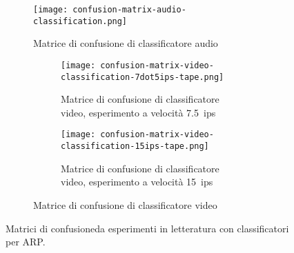 \begin{figure}[h]
    \begin{minipage}{\textwidth}
        \centering
        \begin{subfigure}{0.8\textwidth}
            \centering
            \texttt{[image: confusion-matrix-audio-classification.png]}
            \caption{Matrice di confusione di classificatore audio \cite[min. 35:10]{mpaistandardsMPAIPresentsContextbased2023}}
            \label{fig:confusion-matrix-audio-classification}
        \end{subfigure}
        \par\bigskip
        \begin{subfigure}{0.9\textwidth}
            \centering
            \begin{subfigure}{0.45\textwidth}
                \centering
                \texttt{[image: confusion-matrix-video-classification-7dot5ips-tape.png]}
                \caption{Matrice di confusione di classificatore video, esperimento a velocità \qty{7,5}{ips}}
                \label{fig:confusion-matrix-video-classification-7dot5ips-tape}
            \end{subfigure}
            \hfill
            \begin{subfigure}{0.45\textwidth}
                \centering
                \texttt{[image: confusion-matrix-video-classification-15ips-tape.png]}
                \caption{Matrice di confusione di classificatore video, esperimento a velocità \qty{15}{ips}}
                \label{fig:confusion-matrix-video-classification-15ips-tape}
            \end{subfigure}
            \caption{Matrice di confusione di classificatore video \cite[fig. 3]{prettoComputingMethodologiesSupporting2018}}
            \label{fig:confusion-matrix-video-classification}
         \end{subfigure}
            \caption[Matrici di confusione da esperimenti in letteratura con classificatori per \ac{ARP}.]{Matrici di confusione\footnotemark da esperimenti in letteratura con classificatori per \ac{ARP}.}
            \label{fig:confusion-matrix-audio-video}
        \mpfootnotes
    \end{minipage}
\end{figure}

